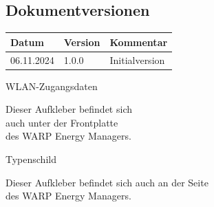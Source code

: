 \documentclass[a4paper,10pt]{article}
\begin{document}
\begin{multicols*}{2}
	\section{Dokumentversionen}
	\begin{tabular}{lll}
		\toprule
		Datum      & Version & Kommentar                       \\
		\midrule
		06.11.2024 & 1.0.0   & Initialversion                  \\
		\bottomrule
	\end{tabular}

	\vfill
	\null
	\newpage

	\columnbreak
    
    \end{multicols*}

    \appendix

	\newpage
	\pagecolor{covergray}\afterpage{\nopagecolor}

   \begin{multicols*}{2}
    \pagestyle{empty}
    \null
    \vfill
	\color{white}
    WLAN-Zugangsdaten
    \begin{tcolorbox}[width=4.2cm,height=2.7cm, boxrule=0.25mm]

    \end{tcolorbox}
	Dieser Aufkleber befindet sich\\ auch unter der Frontplatte\\des WARP Energy
	Managers.
    \columnbreak

    \null
    \vfill
    Typenschild
    \begin{tcolorbox}[width=7.8cm,height=4.1cm, boxrule=0.25mm]

    \end{tcolorbox}
    Dieser Aufkleber befindet sich auch an der Seite\\ des WARP Energy Managers.
\end{multicols*}
\end{document}
